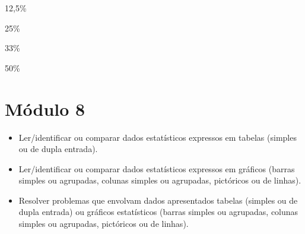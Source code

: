 \begin{escolha}
\item
  12,5\%
\item
  25\%
\item
  33\%
\item
  50\%
\end{escolha}


\chapter{Módulo 8}



\begin{itemize}
\item Ler/identificar ou comparar dados estatísticos expressos em tabelas
(simples ou de dupla entrada).

\item Ler/identificar ou comparar dados estatísticos expressos em gráficos
(barras simples ou agrupadas, colunas simples ou agrupadas, pictóricos
ou de linhas).

\item Resolver problemas que envolvam dados apresentados tabelas (simples ou
de dupla entrada) ou gráficos estatísticos (barras simples ou agrupadas,
colunas simples ou agrupadas, pictóricos ou de linhas).
\end{itemize}

